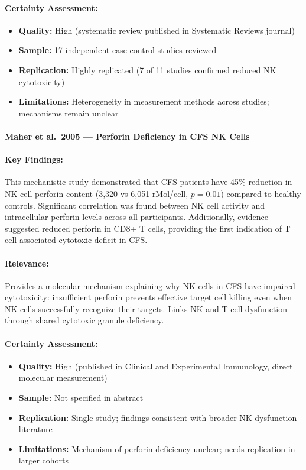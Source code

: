 \paragraph{Certainty Assessment:}
\begin{itemize}
    \item \textbf{Quality:} High (systematic review published in Systematic Reviews journal)
    \item \textbf{Sample:} 17 independent case-control studies reviewed
    \item \textbf{Replication:} Highly replicated (7 of 11 studies confirmed reduced NK cytotoxicity)
    \item \textbf{Limitations:} Heterogeneity in measurement methods across studies; mechanisms remain unclear
\end{itemize}

\paragraph{Maher et al.\ 2005 --- Perforin Deficiency in CFS NK Cells}

\cite{Maher2005}

\paragraph{Key Findings:}
This mechanistic study demonstrated that CFS patients have 45\% reduction in NK cell perforin content (3,320 vs 6,051 rMol/cell, $p = 0.01$) compared to healthy controls. Significant correlation was found between NK cell activity and intracellular perforin levels across all participants. Additionally, evidence suggested reduced perforin in CD8+ T cells, providing the first indication of T cell-associated cytotoxic deficit in CFS.

\paragraph{Relevance:}
Provides a molecular mechanism explaining why NK cells in CFS have impaired cytotoxicity: insufficient perforin prevents effective target cell killing even when NK cells successfully recognize their targets. Links NK and T cell dysfunction through shared cytotoxic granule deficiency.

\paragraph{Certainty Assessment:}
\begin{itemize}
    \item \textbf{Quality:} High (published in Clinical and Experimental Immunology, direct molecular measurement)
    \item \textbf{Sample:} Not specified in abstract
    \item \textbf{Replication:} Single study; findings consistent with broader NK dysfunction literature
    \item \textbf{Limitations:} Mechanism of perforin deficiency unclear; needs replication in larger cohorts
\end{itemize}

